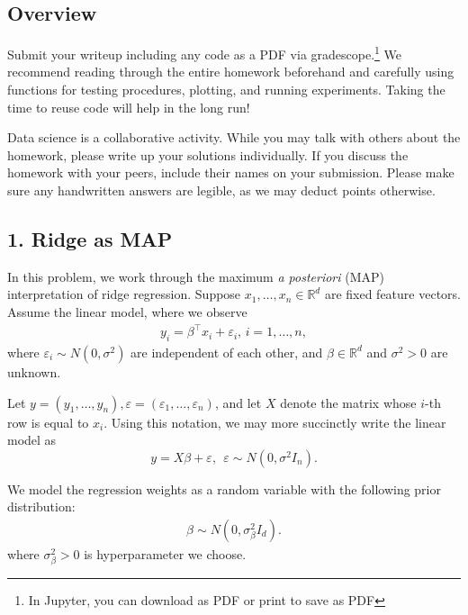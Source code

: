 \documentclass[a4paper,twoside,11pt]{article}
\begin{document}
\title{}
\author{}
\date{}

\maketitle
\vspace{-8em}

\subsection*{Overview}

Submit your writeup including any code as a PDF via gradescope.\footnote{In Jupyter, you can download as PDF or print to save as PDF} We recommend reading through the entire homework beforehand and carefully using functions for testing procedures, plotting, and running experiments. Taking the time to reuse code will help in the long run!

Data science is a collaborative activity. While you may talk with others about the homework, please write up your solutions individually. If you discuss the homework with your peers, include their names on your submission. Please make sure any handwritten answers are legible, as we may deduct points otherwise.

\subsection*{1. Ridge as MAP}

    In this problem, we work through the maximum \textit{a posteriori} (MAP) interpretation of ridge regression. Suppose $x_1,\dots,x_n \in \mathbb{R}^d$ are fixed feature vectors. Assume the linear model, where we observe
\begin{align*} y_i =\beta^\top x_i + \varepsilon_i, \, i = 1, \ldots, n,
\end{align*}
where $\varepsilon_i \sim N(0,\sigma^2)$ are independent of each other, and $\beta\in\mathbb{R}^d$ and $\sigma^2 > 0$ are unknown. 

Let $y = (y_1,\dots,y_n), \varepsilon = (\varepsilon_1, \ldots, \varepsilon_n)$, and let $X$ denote the matrix whose $i$-th row is equal to $x_i$. Using this notation, we may more succinctly write the linear model as
$$
y = X\beta + \varepsilon, ~~\varepsilon\sim N(0, \sigma^2 I_n).
$$

We model the regression weights as a random variable with the following prior distribution:
\begin{align*}
    \beta \sim N (0, \sigma_\beta^2I_d).
\end{align*}
where $\sigma_\beta^2 > 0$ is hyperparameter we choose. 
\end{document}
